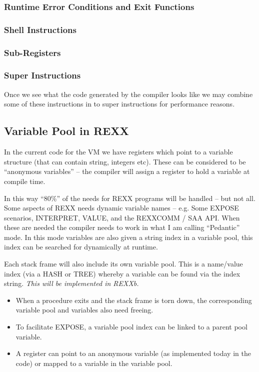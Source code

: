 \subsubsection{Runtime Error Conditions and Exit Functions}

\subsubsection{Shell Instructions}

\subsubsection{Sub-Registers}

\subsubsection{Super Instructions}

Once we see what the code generated by the compiler looks like we may combine some of these instructions in to super instructions for performance reasons.

\subsection{Variable Pool in REXX}

In the current code for the VM we have registers which point to a variable structure (that can contain string, integers etc). These can be considered to be ``anonymous variables'' -- the compiler will assign a register to hold a variable at compile time.

In this way ``80\%'' of the needs for REXX programs will be handled -- but not all. Some aspects of REXX needs dynamic variable names -- e.g. Some EXPOSE scenarios, INTERPRET, VALUE, and the REXXCOMM / SAA API. When these are needed the compiler needs to work in what I am calling ``Pedantic'' mode. In this mode variables are also given a string index in a variable pool, this index can be searched for dynamically at runtime.

Each stack frame will also include its own variable pool. This is a name/value index (via a HASH or TREE) whereby a variable can be found via the index string. \emph{This will be implemented in REXXb.}

\begin{itemize}
\item When a procedure exits and the stack frame is torn down, the corresponding variable pool and variables also need freeing.

\item To facilitate EXPOSE, a variable pool index can be linked to a parent pool variable.

\item A register can point to an anonymous variable (as implemented today in the code) or mapped to a variable in the variable pool.

\end{itemize}
